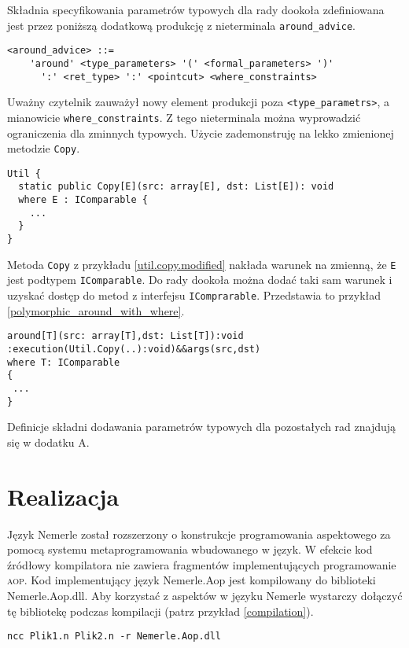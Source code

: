 \documentclass[a4paper,12pt]{mwbk}
\begin{document}
Składnia specyfikowania parametrów typowych dla rady dookoła zdefiniowana
jest przez poniższą dodatkową produkcję z nieterminala \lstinline!around_advice!.

\begin{lstlisting}[style=AspectJ]
<around_advice> ::=
    'around' <type_parameters> '(' <formal_parameters> ')' 
      ':' <ret_type> ':' <pointcut> <where_constraints>

\end{lstlisting}

Uważny czytelnik zauważył nowy element produkcji poza \lstinline!<type_parametrs>!, 
a mianowicie \lstinline!where_constraints!. Z tego nieterminala można wyprowadzić
ograniczenia dla zminnych typowych. Użycie zademonstruję na lekko zmienionej metodzie
\lstinline!Copy!.

\begin{lstlisting}[style=AspectJ,caption=Polimorficzna metoda Copy,label=util.copy.modified]
Util {
  static public Copy[E](src: array[E], dst: List[E]): void
  where E : IComparable {
    ...
  }
}
\end{lstlisting}

Metoda \lstinline!Copy! z przykładu \ref{util.copy.modified} nakłada
warunek na zmienną, że \lstinline!E! jest podtypem \lstinline!IComparable!.
Do rady dookoła można dodać taki sam warunek i uzyskać dostęp do metod z
interfejsu \lstinline!IComprarable!. Przedstawia to przykład \ref{polymorphic_around_with_where}.

\begin{lstlisting}[style=AspectJ,caption=Rada polimorficzna,label=polymorphic_around_with_where]
around[T](src: array[T],dst: List[T]):void
:execution(Util.Copy(..):void)&&args(src,dst)
where T: IComparable
{
 ... 
}
\end{lstlisting}

Definicje składni dodawania parametrów typowych dla pozostałych rad
znajdują się w dodatku A.



\chapter{Realizacja} 

Język Nemerle został rozszerzony o konstrukcje programowania aspektowego za
pomocą systemu metaprogramowania wbudowanego w język. W efekcie kod źródłowy
kompilatora nie zawiera fragmentów implementujących programowanie \textsc{aop}. Kod
implementujący język Nemerle.Aop jest kompilowany do biblioteki
Nemerle.Aop.dll. Aby korzystać z aspektów w języku Nemerle wystarczy dołączyć
tę bibliotekę podczas kompilacji (patrz przykład \ref{compilation}).
\begin{lstlisting}[style=AspectJ,caption=Kompilacja programu z aspektami,label=compilation]
    ncc Plik1.n Plik2.n -r Nemerle.Aop.dll
\end{lstlisting}
\end{document}
